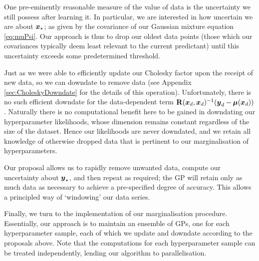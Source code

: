 \documentclass{acmtrans2m}
\begin{document}
One pre-eminently reasonable measure of the value of data is the uncertainty we still possess after learning it. In particular, we are interested in how uncertain we are about $\boldsymbol{x}_\star$; as given by the covariance of our Gaussian mixture equation \eqref{eq:muPsi}. Our approach is thus to drop our oldest data points (those which our covariances typically deem least relevant to the current predictant) until this uncertainty exceeds some predetermined threshold. 

Just as we were able to efficiently update our Cholesky factor upon the receipt of new data, so we can downdate to remove data (see Appendix \ref{sec:CholeskyDowndate} for the details of this operation). Unfortunately, there is no such efficient downdate for the data-dependent term $\mathbf{R}(\boldsymbol{x}_d,\boldsymbol{x}_d)^{-1}(\boldsymbol{y}_d-\boldsymbol{\mu}(\boldsymbol{x}_d))$. Naturally there is no computational benefit here to be gained in downdating our hyperparameter likelihoods, whose dimension remains constant regardless of the size of the dataset. Hence our likelihoods are never downdated, and we retain all knowledge of otherwise dropped data that is pertinent to our marginalisation of hyperparameters. 

Our proposal allows us to rapidly remove unwanted data, compute our uncertainty about $\boldsymbol{y}_\star$, and then repeat as required; the GP will retain only as much data as necessary to achieve a pre-specified degree of accuracy. This allows a principled way of `windowing' our data series.

Finally, we turn to the implementation of our marginalisation procedure. Essentially, our approach is to maintain an ensemble of GPs, one for each hyperparameter sample, each of which we update and downdate according to the proposals above. Note that the computations for each hyperparameter sample can be treated independently, lending our algorithm to parallelisation. 
\end{document}
